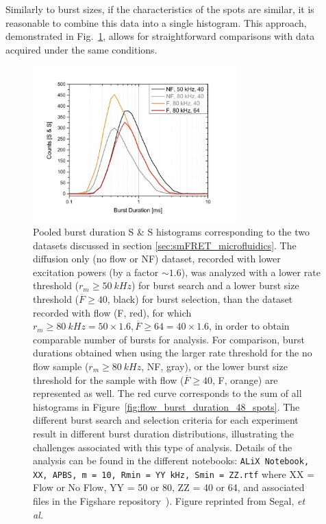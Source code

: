 Similarly to burst sizes, if the characteristics of the spots are similar, it is reasonable to combine this data into a single histogram. 
This approach, demonstrated in Fig.~\ref{fig:pooled_burst_duration}, allows for straightforward comparisons with data acquired under the same conditions.

\begin{figure}
\centering\includegraphics[width=0.7\textwidth]{chapters/figures/pooled_burst_duration.jpg}
\caption{\label{fig:pooled_burst_duration}
Pooled burst duration S \& S histograms corresponding to the two datasets discussed
in section \ref{sec:smFRET_microfluidics}. 
The diffusion only (no flow or NF) dataset, recorded with lower excitation powers (by a factor $\sim1.6$), was analyzed with a lower rate threshold ($r_m \geq 50~kHz$) for burst search and a lower burst size threshold ($\overline{F} \geq 40$, black) for burst selection, than the dataset recorded with flow (F, red), for which $r_m \geq 80~kHz = 50 \times 1.6, \overline{F} \geq 64 = 40 \times 1.6$, in order to obtain comparable number of bursts for analysis.
For comparison, burst durations obtained when using the larger rate threshold for the no flow sample  ($r_m \geq 80~kHz$, NF, gray), or the lower burst size threshold for the sample with flow ($\overline{F} \geq 40$, F, orange) are represented as well. 
The red curve corresponds to the sum of all histograms in Figure~\ref{fig:flow_burst_duration_48_spots}.
The different burst search and selection criteria for each experiment result in different burst duration distributions, illustrating the challenges associated with this type of analysis.
Details of the analysis can be found in the different notebooks: \texttt{ALiX Notebook, XX, \ac{APBS}, m = 10, Rmin = YY kHz, Smin = ZZ.rtf} where XX = Flow or No Flow, YY = 50 or 80, ZZ = 40 or 64, and associated files in the Figshare repository~\cite{figshare_repo_2019}).
Figure reprinted from Segal, \textit{et al.}~\cite{segal_methods_2019}
}
\end{figure}

